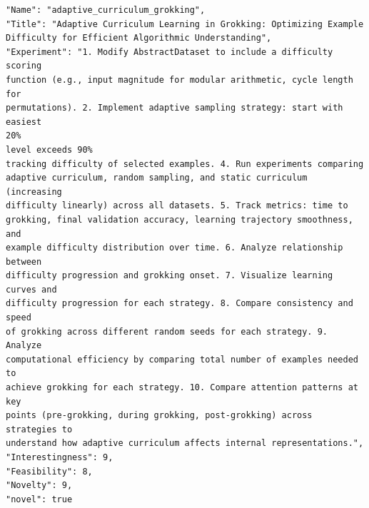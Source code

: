 \documentclass[11pt, a4paper]{include/gdm_format}
\begin{document}
\begin{tcolorbox}[breakable,colback=blue!5!white, colframe=blue!75!black, title=Idea 39/50 - \texttt{adaptive\_curriculum\_grokking}]
\small
\begin{verbatim}
"Name": "adaptive_curriculum_grokking",
"Title": "Adaptive Curriculum Learning in Grokking: Optimizing Example
Difficulty for Efficient Algorithmic Understanding",
"Experiment": "1. Modify AbstractDataset to include a difficulty scoring
function (e.g., input magnitude for modular arithmetic, cycle length for
permutations). 2. Implement adaptive sampling strategy: start with easiest
20%
level exceeds 90%
tracking difficulty of selected examples. 4. Run experiments comparing
adaptive curriculum, random sampling, and static curriculum (increasing
difficulty linearly) across all datasets. 5. Track metrics: time to
grokking, final validation accuracy, learning trajectory smoothness, and
example difficulty distribution over time. 6. Analyze relationship between
difficulty progression and grokking onset. 7. Visualize learning curves and
difficulty progression for each strategy. 8. Compare consistency and speed
of grokking across different random seeds for each strategy. 9. Analyze
computational efficiency by comparing total number of examples needed to
achieve grokking for each strategy. 10. Compare attention patterns at key
points (pre-grokking, during grokking, post-grokking) across strategies to
understand how adaptive curriculum affects internal representations.",
"Interestingness": 9,
"Feasibility": 8,
"Novelty": 9,
"novel": true
\end{verbatim}
\end{tcolorbox}
\end{document}
